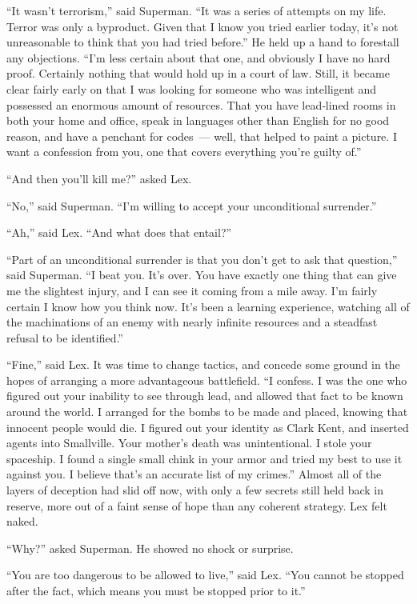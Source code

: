 \documentclass[ebook,12pt]{memoir}
\begin{document}
``It wasn't terrorism,'' said Superman. ``It was a series of attempts on
my life. Terror was only a byproduct. Given that I know you tried
earlier today, it's not unreasonable to think that you had tried
before.'' He held up a hand to forestall any objections. ``I'm less
certain about that one, and obviously I have no hard proof. Certainly
nothing that would hold up in a court of law. Still, it became clear
fairly early on that I was looking for someone who was intelligent and
possessed an enormous amount of resources. That you have lead‐lined
rooms in both your home and office, speak in languages other than
English for no good reason, and have a penchant for codes~--- well, that
helped to paint a picture. I want a confession from you, one that covers
everything you're guilty of.''

``And then you'll kill me?'' asked Lex.

``No,'' said Superman. ``I'm willing to accept your unconditional
surrender.''

``Ah,'' said Lex. ``And what does that entail?''

``Part of an unconditional surrender is that you don't get to ask that
question,'' said Superman. ``I beat you. It's over. You have exactly one
thing that can give me the slightest injury, and I can see it coming
from a mile away. I'm fairly certain I know how you think now. It's been
a learning experience, watching all of the machinations of an enemy with
nearly infinite resources and a steadfast refusal to be identified.''

``Fine,'' said Lex. It was time to change tactics, and concede some
ground in the hopes of arranging a more advantageous battlefield. ``I
confess. I was the one who figured out your inability to see through
lead, and allowed that fact to be known around the world. I arranged for
the bombs to be made and placed, knowing that innocent people would die.
I figured out your identity as Clark Kent, and inserted agents into
Smallville. Your mother's death was unintentional. I stole your
spaceship. I found a single small chink in your armor and tried my best
to use it against you. I believe that's an accurate list of my crimes.''
Almost all of the layers of deception had slid off now, with only a few
secrets still held back in reserve, more out of a faint sense of hope
than any coherent strategy. Lex felt naked.

``Why?'' asked Superman. He showed no shock or surprise.

``You are too dangerous to be allowed to live,'' said Lex. ``You cannot
be stopped after the fact, which means you must be stopped prior to
it.''
\end{document}
